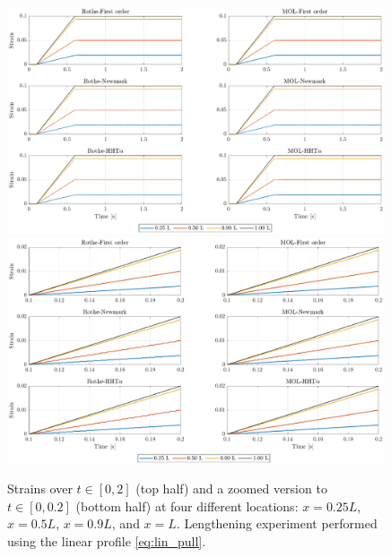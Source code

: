 \documentclass{sfuthesis}
\numberwithin{equation}{section}
\numberwithin{figure}{chapter}
\numberwithin{table}{chapter}
\theoremstyle{definition}
\begin{document}
\begin{figure}
    \centering
    \includegraphics[width=0.99\textwidth]{nh_linear_disp_1.eps}
    \includegraphics[width=0.99\textwidth]{nh_linear_disp_2.eps}
    \caption{Strains over $t \in [0,2]$ (top half) and a zoomed version to $t \in [0,0.2]$ (bottom half) at four different locations: $x = 0.25L$, $x=0.5L$, $x=0.9L$, and $x=L$. Lengthening experiment performed using the linear profile \eqref{eq:lin_pull}.
    \label{fig:lin_pull_disp}}
\end{figure}
\end{document}
